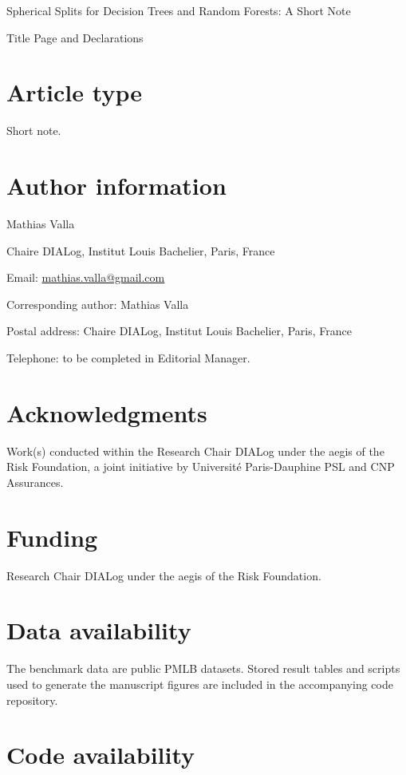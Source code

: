 \documentclass[12pt]{article}
\begin{document}
\begin{center}
{\Large Spherical Splits for Decision Trees and Random Forests: A Short Note}

\vspace{1em}
Title Page and Declarations
\end{center}

\section*{Article type}

Short note.

\section*{Author information}

Mathias Valla

Chaire DIALog, Institut Louis Bachelier, Paris, France

Email: \href{mailto:mathias.valla@gmail.com}{mathias.valla@gmail.com}

Corresponding author: Mathias Valla

Postal address: Chaire DIALog, Institut Louis Bachelier, Paris, France

Telephone: to be completed in Editorial Manager.

\section*{Acknowledgments}

Work(s) conducted within the Research Chair DIALog under the aegis of the Risk
Foundation, a joint initiative by Universit\'e Paris-Dauphine PSL and CNP
Assurances.

\section*{Funding}

Research Chair DIALog under the aegis of the Risk Foundation.

\section*{Data availability}

The benchmark data are public PMLB datasets. Stored result tables and scripts
used to generate the manuscript figures are included in the accompanying code
repository.

\section*{Code availability}
\end{document}
